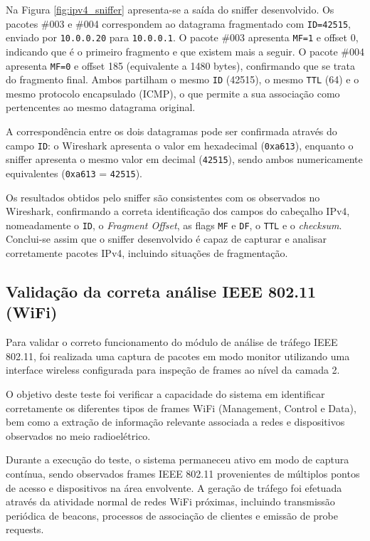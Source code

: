 \documentclass[a4paper,12pt]{article}
\begin{document}
Na Figura \ref{fig:ipv4_sniffer} apresenta-se a saída do sniffer desenvolvido. Os pacotes
\#003 e \#004 correspondem ao datagrama fragmentado com \texttt{ID=42515}, enviado por
\texttt{10.0.0.20} para \texttt{10.0.0.1}. O pacote \#003 apresenta \texttt{MF=1} e offset 0,
indicando que é o primeiro fragmento e que existem mais a seguir. O pacote \#004 apresenta
\texttt{MF=0} e offset 185 (equivalente a 1480 bytes), confirmando que se trata do fragmento
final. Ambos partilham o mesmo \texttt{ID} (42515), o mesmo \texttt{TTL} (64) e o mesmo protocolo
encapsulado (ICMP), o que permite a sua associação como pertencentes ao mesmo datagrama original.


A correspondência entre os dois datagramas pode ser confirmada através do campo \texttt{ID}: 
o Wireshark apresenta o valor em hexadecimal (\texttt{0xa613}), enquanto o sniffer apresenta 
o mesmo valor em decimal (\texttt{42515}), sendo ambos numericamente equivalentes 
(\texttt{0xa613} = \texttt{42515}).



Os resultados obtidos pelo sniffer são consistentes com os observados no Wireshark,
confirmando a correta identificação dos campos do cabeçalho IPv4, nomeadamente o
\texttt{ID}, o \textit{Fragment Offset}, as flags \texttt{MF} e \texttt{DF}, o \texttt{TTL} e o \textit{checksum}.
Conclui-se assim que o sniffer desenvolvido é capaz de capturar e analisar corretamente
pacotes IPv4, incluindo situações de fragmentação.



\subsection{Validação da correta análise IEEE 802.11 (WiFi)}

Para validar o correto funcionamento do módulo de análise de tráfego IEEE 802.11, foi realizada uma captura de pacotes em modo monitor utilizando uma interface wireless configurada para inspeção de frames ao nível da camada 2.

O objetivo deste teste foi verificar a capacidade do sistema em identificar corretamente os diferentes tipos de frames WiFi (Management, Control e Data), bem como a extração de informação relevante associada a redes e dispositivos observados no meio radioelétrico.

Durante a execução do teste, o sistema permaneceu ativo em modo de captura contínua, sendo observados frames IEEE 802.11 provenientes de múltiplos pontos de acesso e dispositivos na área envolvente. A geração de tráfego foi efetuada através da atividade normal de redes WiFi próximas, incluindo transmissão periódica de beacons, processos de associação de clientes e emissão de probe requests.
\end{document}
